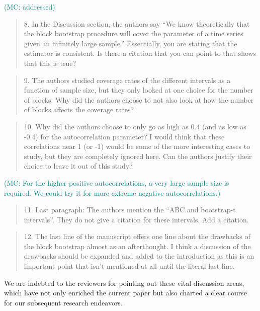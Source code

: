 \documentclass[12pt]{article}
\newcommand{\mc}[1]{\textcolor{teal}{(MC: #1)}}
\newenvironment{comment}%
{\begin{quotation}\noindent\small\it\color{darkblue}\ignorespaces%
}{\end{quotation}}
\begin{document}
\mc{addressed}

\begin{comment}
8.   In the Discussion section, the authors say “We know theoretically that the 
block bootstrap procedure will cover the parameter of a time series given an 
infinitely large sample.”  Essentially, you are stating that the estimator is 
consistent.  Is there a citation that you can point to that shows that this is 
true? 
\end{comment}



\begin{comment}
9.   The authors studied coverage rates of the different intervals as a function 
of sample size, but they only looked at one choice for the number of blocks.  
Why did the authors choose to not also look at how the number of blocks affects 
the coverage rates?
\end{comment}

\citep{ratick2009175}

\begin{comment}
10.   Why did the authors choose to only go as high as 0.4 (and as low as -0.4) 
for the autocorrelation parameter?  I would think that these correlations near 1 
(or -1) would be some of the more interesting cases to study, but they are 
completely ignored here.  Can the authors justify their choice to leave it out 
of this study?
\end{comment}

\mc{For the higher positive autocorrelations, a very large sample size is
required. We could try it for more extreme negative autocorrelations.}

\begin{comment}
11.    Last paragraph: The authors mention the “ABC and bootstrap-t intervals”.  
They do not give a citation for these intervals.   Add a citation. 
\end{comment}

\citep[p.160]{efron1993introduction}
\citep[p.188]{efron1993introduction}


\begin{comment}
12.    The last line of the manuscript offers one line about the drawbacks of 
the block bootstrap almost as an afterthought.  I think a discussion of the 
drawbacks should be expanded and added to the introduction as this is an 
important point that isn’t mentioned at all until the literal last line. 
\end{comment}

We are indebted to the reviewers for pointing out these vital discussion areas,
which have not only enriched the current paper but also charted a clear course
for our subsequent research endeavors.




\end{document}
